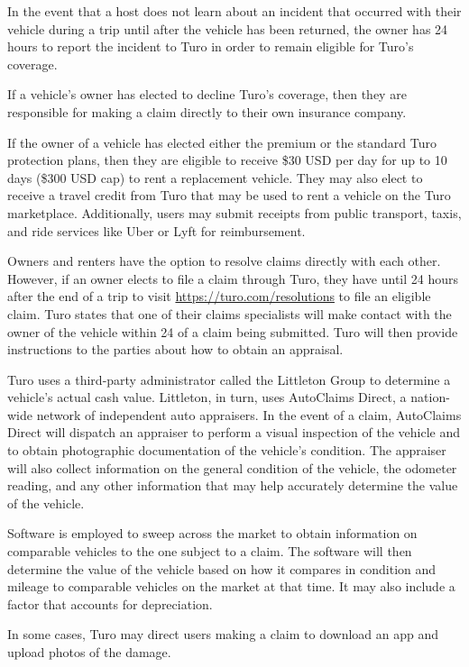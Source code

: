 \documentclass[review,12pt]{elsarticle}
\begin{document}
In the event that a host does not learn about an incident that occurred with their vehicle during a trip until after the vehicle has been returned, the owner has 24 hours to report the incident to Turo in order to remain eligible for Turo's coverage.

If a vehicle's owner has elected to decline Turo's coverage, then they are responsible for making a claim directly to their own insurance company.

If the owner of a vehicle has elected either the premium or the standard Turo protection plans, then they are eligible to receive \$30 USD per day for up to 10 days (\$300 USD cap) to rent a replacement vehicle. They may also elect to receive a travel credit from Turo that may be used to rent a vehicle on the Turo marketplace. Additionally, users may submit receipts from public transport, taxis, and ride services like Uber or Lyft for reimbursement.

Owners and renters have the option to resolve claims directly with each other. However, if an owner elects to file a claim through Turo, they have until 24 hours after the end of a trip to visit \url{https://turo.com/resolutions} to file an eligible claim. Turo states that one of their claims specialists will make contact with the owner of the vehicle within 24 of a claim being submitted. Turo will then provide instructions to the parties about how to obtain an appraisal.

Turo uses a third-party administrator called the Littleton Group to determine a vehicle's actual cash value. Littleton, in turn, uses AutoClaims Direct, a nation-wide network of independent auto appraisers. In the event of a claim, AutoClaims Direct will dispatch an appraiser to perform a visual inspection of the vehicle and to obtain photographic documentation of the vehicle's condition. The appraiser will also collect information on the general condition of the vehicle, the odometer reading, and any other information that may help accurately determine the value of the vehicle.

Software is employed to sweep across the market to obtain information on comparable vehicles to the one subject to a claim. The software will then determine the value of the vehicle based on how it compares in condition and mileage to comparable vehicles on the market at that time. It may also include a factor that accounts for depreciation.

In some cases, Turo may direct users making a claim to download an app and upload photos of the damage.
\end{document}
